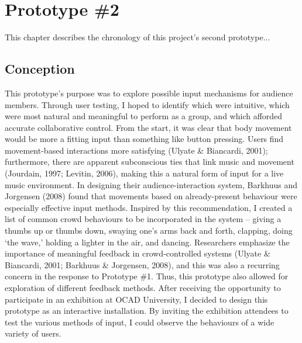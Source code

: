 \chapter{Prototype \#2}

This chapter describes the chronology of this project's second prototype...

\section{Conception}

This prototype's purpose was to explore possible input mechanisms for audience members. Through user testing, I hoped to identify which were intuitive, which were most natural and meaningful to perform as a group, and which afforded accurate collaborative control. From the start, it was clear that body movement would be more a fitting input than something like button pressing. Users find movement-based interactions more satisfying (Ulyate \& Biancardi, 2001); furthermore, there are apparent subconscious ties that link music and movement (Jourdain, 1997; Levitin, 2006), making this a natural form of input for a live music environment. In designing their audience-interaction system, Barkhuus and Jorgensen (2008) found that movements based on already-present behaviour were especially effective input methods. Inspired by this recommendation, I created a list of common crowd behaviours to be incorporated in the system -- giving a thumbs up or thumbs down, swaying one's arms back and forth, clapping, doing `the wave,' holding a lighter in the air, and dancing. Researchers emphasize the importance of meaningful feedback in crowd-controlled systems (Ulyate \& Biancardi, 2001; Barkhuus \& Jorgensen, 2008), and this was also a recurring concern in the response to Prototype \#1. Thus, this prototype also allowed for exploration of different feedback methods. After receiving the opportunity to participate in an exhibition at OCAD University, I decided to design this prototype as an interactive installation. By inviting the exhibition attendees to test the various methods of input, I could observe the behaviours of a wide variety of users.

